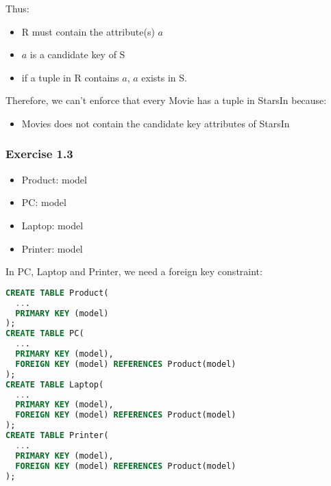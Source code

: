 \documentclass[../../main.tex]{subfiles}
\begin{document}
Thus:

\begin{itemize}
\item R must contain the attribute(s) $a$
\item $a$ is a candidate key of S
\item if a tuple in R contains $a$, $a$ exists in S.
\end{itemize}

Therefore, we can't enforce that every Movie has a tuple in StarsIn because:

\begin{itemize}
\item Movies does not contain the candidate key attributes of StarsIn
\end{itemize}

\subsubsection*{Exercise 1.3}

\begin{itemize}
\item Product: model
\item PC: model
\item Laptop: model
\item Printer: model  
\end{itemize}

In PC, Laptop and Printer, we need a foreign key constraint:

\begin{lstlisting}[language=sql]
CREATE TABLE Product(
  ...
  PRIMARY KEY (model)
);
CREATE TABLE PC(
  ...
  PRIMARY KEY (model),
  FOREIGN KEY (model) REFERENCES Product(model)
);
CREATE TABLE Laptop(
  ...
  PRIMARY KEY (model),
  FOREIGN KEY (model) REFERENCES Product(model)
);
CREATE TABLE Printer(
  ...
  PRIMARY KEY (model),
  FOREIGN KEY (model) REFERENCES Product(model)
);

\end{lstlisting}
\end{document}
